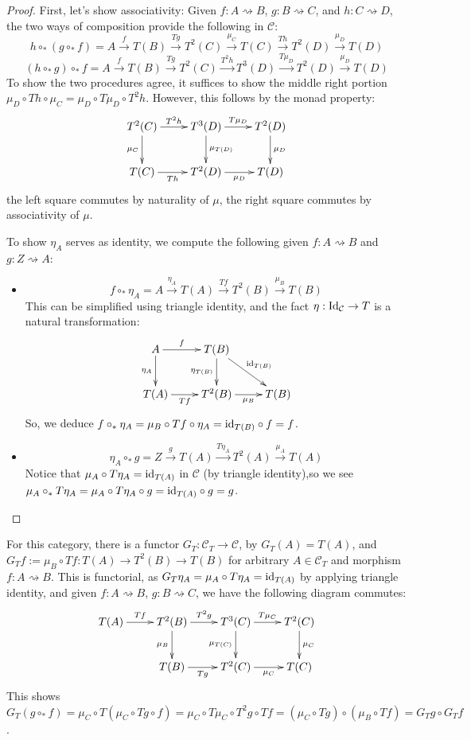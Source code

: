 \documentclass{article}
\begin{document}
\begin{proof}
    First, let's show associativity: Given $f:A\rightsquigarrow B$, $g:B\rightsquigarrow C$, and $h:C\rightsquigarrow D$, the two ways of composition provide the following in $\mathcal{C}$:
    \[h\circ_* (g\circ_* f) = A\xrightarrow{f}T(B)\xrightarrow{Tg}T^2(C)\xrightarrow{\mu_C}T(C) \xrightarrow{Th}T^2(D)\xrightarrow{\mu_D}T(D)\]
    \[(h\circ_* g)\circ_* f = A\xrightarrow{f}T(B) \xrightarrow{Tg} T^2(C) \xrightarrow{T^2h}T^3(D) \xrightarrow{T\mu_D}T^2(D) \xrightarrow{\mu_D} T(D)\]
    To show the two procedures agree, it suffices to show the middle right portion $\mu_D\circ Th\circ \mu_C = \mu_D \circ T\mu_D \circ T^2h$. However, this follows by the monad property:
    \[\xymatrix{
        T^2(C) \ar[r]^-{T^2 h}\ar[d]_-{\mu_C} & T^3(D) \ar[d]^-{\mu_{T(D)}} \ar[r]^-{T\mu_{D}} & T^2(D) \ar[d]^-{\mu_D}\\
        T(C) \ar[r]_-{Th} & T^2(D) \ar[r]_-{\mu_D} & T(D)
    }\]
    the left square commutes by naturality of $\mu$, the right square commutes by associativity of $\mu$.

    \hfil

    To show $\eta_A$ serves as identity, we compute the following given $f:A\rightsquigarrow B$ and $g:Z\rightsquigarrow A$:
    \begin{itemize}
        \item \[f\circ_* \eta_A = A\xrightarrow{\eta_A}T(A) \xrightarrow{Tf} T^2(B) \xrightarrow{\mu_B}T(B)\]
        This can be simplified using triangle identity, and the fact $\eta:\mathrm{Id}_\mathcal{C}\rightarrow T$ is a natural transformation:
        \[\xymatrix{
            A \ar[d]_-{\eta_A} \ar[r]^-{f} & T(B) \ar[d]_-{\eta_{T(B)}} \ar[dr]^-{\id_{T(B)}}\\
            T(A) \ar[r]_-{Tf} & T^2(B) \ar[r]_-{\mu_{B}} & T(B)
        }\]
        So, we deduce $f\circ_* \eta_A =\mu_B\circ Tf\circ \eta_A = \mathrm{id}_{T(B)}\circ f = f$.
        \item \[\eta_A\circ_* g = Z\xrightarrow{g}T(A) \xrightarrow{T\eta_A} T^2(A) \xrightarrow{\mu_A}T(A)\]
        Notice that $\mu_A\circ T\eta_A = \mathrm{id}_{T(A)}$ in $\mathcal{C}$ (by triangle identity),so we see $\mu_A\circ_* T\eta_A =\mu_A\circ T\eta_A \circ g = \mathrm{id}_{T(A)}\circ g= g$.
    \end{itemize}
\end{proof}

\hfil

For this category, there is a functor $G_T:\mathcal{C}_T\rightarrow \mathcal{C}$, by $G_T (A) = T(A)$, and $G_T f:= \mu_B\circ Tf:T(A)\rightarrow T^2(B)\rightarrow T(B)$ for arbitrary $A\in\mathcal{C}_T$ and morphism $f:A\rightsquigarrow B$. This is functorial, as $G_T \eta_A = \mu_A\circ T\eta_A = \mathrm{id}_{T(A)}$ by applying triangle identity, and given $f:A\rightsquigarrow B$, $g:B\rightsquigarrow C$, we have the following diagram commutes:
\[\xymatrix{
    T(A) \ar[r]^-{Tf} & T^2(B) \ar[d]_-{\mu_B} \ar[r]^-{T^2 g} & T^3(C) \ar[d]_-{\mu_{T(C)}} \ar[r]^-{T\mu_C} & T^2(C) \ar[d]^-{\mu_C}\\
    & T(B) \ar[r]_-{Tg} & T^2(C) \ar[r]_-{\mu_C} & T(C)
}\]
This shows $G_T(g\circ_* f) = \mu_C \circ T(\mu_C\circ Tg\circ f) = \mu_C\circ T\mu_C \circ T^2g\circ Tf = (\mu_C\circ Tg)\circ (\mu_B\circ Tf) = G_T g\circ G_T f$.
\end{document}
